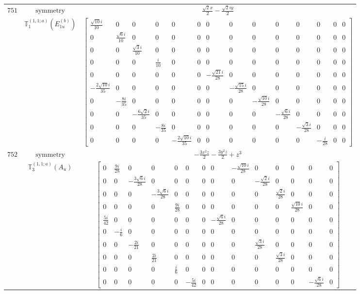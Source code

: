 \documentclass[fleqn,8pt,landscape]{jsarticle}
\begin{document}
\begin{longtable}{ccc}
$ 751 $ & $ \text{symmetry} $ & $ \frac{\sqrt{2} x}{2} - \frac{\sqrt{2} i y}{2} $ \\
$  $ & $ \mathbb{T}_{1}^{(1,1;a)}(E_{1u}^{(b)}) $ & $ \begin{bmatrix} \frac{\sqrt{10} i}{10} & 0 & 0 & 0 & 0 & 0 & 0 & 0 & 0 & 0 & 0 & 0 & 0 & 0 \\ 0 & \frac{\sqrt{6} i}{10} & 0 & 0 & 0 & 0 & 0 & 0 & 0 & 0 & 0 & 0 & 0 & 0 \\ 0 & 0 & \frac{\sqrt{3} i}{10} & 0 & 0 & 0 & 0 & 0 & 0 & 0 & 0 & 0 & 0 & 0 \\ 0 & 0 & 0 & \frac{i}{10} & 0 & 0 & 0 & 0 & 0 & 0 & 0 & 0 & 0 & 0 \\ 0 & 0 & 0 & 0 & 0 & 0 & - \frac{\sqrt{21} i}{28} & 0 & 0 & 0 & 0 & 0 & 0 & 0 \\ - \frac{2 \sqrt{10} i}{35} & 0 & 0 & 0 & 0 & 0 & 0 & - \frac{\sqrt{15} i}{28} & 0 & 0 & 0 & 0 & 0 & 0 \\ 0 & - \frac{8 i}{35} & 0 & 0 & 0 & 0 & 0 & 0 & - \frac{\sqrt{10} i}{28} & 0 & 0 & 0 & 0 & 0 \\ 0 & 0 & - \frac{6 \sqrt{2} i}{35} & 0 & 0 & 0 & 0 & 0 & 0 & - \frac{\sqrt{6} i}{28} & 0 & 0 & 0 & 0 \\ 0 & 0 & 0 & - \frac{8 i}{35} & 0 & 0 & 0 & 0 & 0 & 0 & - \frac{\sqrt{3} i}{28} & 0 & 0 & 0 \\ 0 & 0 & 0 & 0 & - \frac{2 \sqrt{10} i}{35} & 0 & 0 & 0 & 0 & 0 & 0 & - \frac{i}{28} & 0 & 0 \end{bmatrix} $ \\ \hline
$ 752 $ & $ \text{symmetry} $ & $ - \frac{3 x^{2} z}{2} - \frac{3 y^{2} z}{2} + z^{3} $ \\
$  $ & $ \mathbb{T}_{3}^{(1,1;a)}(A_{u}) $ & $ \begin{bmatrix} 0 & \frac{9 i}{28} & 0 & 0 & 0 & 0 & 0 & 0 & - \frac{\sqrt{10} i}{28} & 0 & 0 & 0 & 0 & 0 \\ 0 & 0 & - \frac{3 \sqrt{6} i}{28} & 0 & 0 & 0 & 0 & 0 & 0 & - \frac{\sqrt{2} i}{28} & 0 & 0 & 0 & 0 \\ 0 & 0 & 0 & - \frac{3 \sqrt{6} i}{28} & 0 & 0 & 0 & 0 & 0 & 0 & \frac{\sqrt{2} i}{28} & 0 & 0 & 0 \\ 0 & 0 & 0 & 0 & \frac{9 i}{28} & 0 & 0 & 0 & 0 & 0 & 0 & \frac{\sqrt{10} i}{28} & 0 & 0 \\ \frac{5 i}{42} & 0 & 0 & 0 & 0 & 0 & 0 & - \frac{\sqrt{6} i}{28} & 0 & 0 & 0 & 0 & 0 & 0 \\ 0 & - \frac{i}{6} & 0 & 0 & 0 & 0 & 0 & 0 & 0 & 0 & 0 & 0 & 0 & 0 \\ 0 & 0 & - \frac{2 i}{21} & 0 & 0 & 0 & 0 & 0 & 0 & \frac{\sqrt{3} i}{28} & 0 & 0 & 0 & 0 \\ 0 & 0 & 0 & \frac{2 i}{21} & 0 & 0 & 0 & 0 & 0 & 0 & \frac{\sqrt{3} i}{28} & 0 & 0 & 0 \\ 0 & 0 & 0 & 0 & \frac{i}{6} & 0 & 0 & 0 & 0 & 0 & 0 & 0 & 0 & 0 \\ 0 & 0 & 0 & 0 & 0 & - \frac{5 i}{42} & 0 & 0 & 0 & 0 & 0 & 0 & - \frac{\sqrt{6} i}{28} & 0 \end{bmatrix} $ \\ \hline

\end{longtable}
\end{document}
